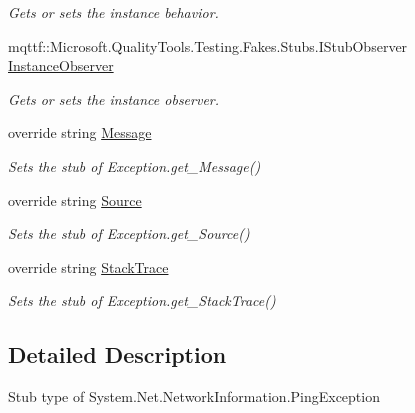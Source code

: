 \begin{DoxyCompactItemize}
\begin{DoxyCompactList}\small\item\em Gets or sets the instance behavior.\end{DoxyCompactList}\item 
mqttf\-::\-Microsoft.\-Quality\-Tools.\-Testing.\-Fakes.\-Stubs.\-I\-Stub\-Observer \hyperlink{class_system_1_1_net_1_1_network_information_1_1_fakes_1_1_stub_ping_exception_a068d0146c2dd258e0a8a83caad8460ce}{Instance\-Observer}
\begin{DoxyCompactList}\small\item\em Gets or sets the instance observer.\end{DoxyCompactList}\item 
override string \hyperlink{class_system_1_1_net_1_1_network_information_1_1_fakes_1_1_stub_ping_exception_adadecc1fe2dc44d98e847b9827a4407a}{Message}
\begin{DoxyCompactList}\small\item\em Sets the stub of Exception.\-get\-\_\-\-Message()\end{DoxyCompactList}\item 
override string \hyperlink{class_system_1_1_net_1_1_network_information_1_1_fakes_1_1_stub_ping_exception_ad87f584df6c14b8e5e7e2ac6338cd362}{Source}
\begin{DoxyCompactList}\small\item\em Sets the stub of Exception.\-get\-\_\-\-Source()\end{DoxyCompactList}\item 
override string \hyperlink{class_system_1_1_net_1_1_network_information_1_1_fakes_1_1_stub_ping_exception_a6ebd71972496b19e4ffd19394cd94cdc}{Stack\-Trace}
\begin{DoxyCompactList}\small\item\em Sets the stub of Exception.\-get\-\_\-\-Stack\-Trace()\end{DoxyCompactList}\end{DoxyCompactItemize}


\subsection{Detailed Description}
Stub type of System.\-Net.\-Network\-Information.\-Ping\-Exception



